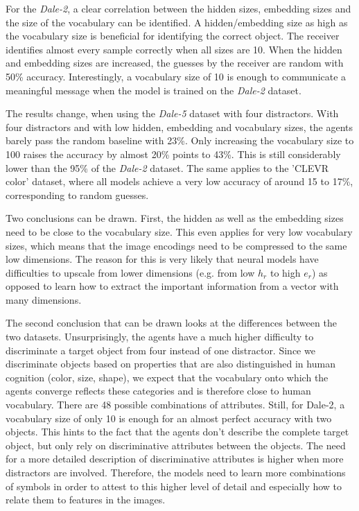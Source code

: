 For the \emph{Dale-2}, a clear correlation between the hidden sizes, embedding sizes and the size of the vocabulary can be identified.
A hidden/embedding size as high as the vocabulary size is beneficial for identifying the correct object.
The receiver identifies almost every sample correctly when all sizes are 10.
When the hidden and embedding sizes are increased, the guesses by the receiver are random with 50\% accuracy.
Interestingly, a vocabulary size of 10 is enough to communicate a meaningful message when the model is trained on the \emph{Dale-2} dataset.

The results change, when using the \emph{Dale-5} dataset with four distractors.
With four distractors and with low hidden, embedding and vocabulary sizes, the agents barely pass the random baseline with 23\%.
Only increasing the vocabulary size to 100 raises the accuracy by almost 20\% points to 43\%.
This is still considerably lower than the 95\% of the \emph{Dale-2} dataset.
The same applies to the 'CLEVR color' dataset, where all models achieve a very low accuracy of around 15 to 17\%, corresponding to random guesses.


Two conclusions can be drawn.
First, the hidden as well as the embedding sizes need to be close to the vocabulary size.
This even applies for very low vocabulary sizes, which means that the image encodings need to be compressed to the same low dimensions.
The reason for this is very likely that neural models have difficulties to upscale from lower dimensions (e.g. from low $h_r$ to high $e_r$) as opposed to learn how to extract the important information from a vector with many dimensions.

The second conclusion that can be drawn looks at the differences between the two datasets.
Unsurprisingly, the agents have a much higher difficulty to discriminate a target object from four instead of one distractor.
Since we discriminate objects based on properties that are also distinguished in human cognition (color, size, shape), we expect that the vocabulary onto which the agents converge reflects these categories and is therefore close to human vocabulary.
There are 48 possible combinations of attributes.
Still, for Dale-2, a vocabulary size of only 10 is enough for an almost perfect accuracy with two objects.
This hints to the fact that the agents don't describe the complete target object, but only rely on discriminative attributes between the objects.
The need for a more detailed description of discriminative attributes is higher when more distractors are involved.
Therefore, the models need to learn more combinations of symbols in order to attest to this higher level of detail and especially how to relate them to features in the images.

